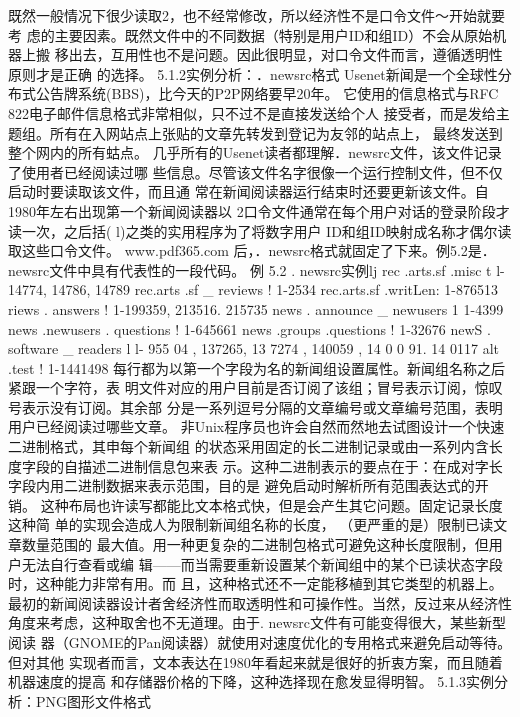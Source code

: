 \documentclass[11pt,oneside]{book}
\begin{document}
\begin{common-format}
    既然一般情况下很少读取2，也不经常修改，所以经济性不是口令文件～开始就要考
虑的主要因素。既然文件中的不同数据（特别是用户ID和组ID）不会从原始机器上搬
移出去，互用性也不是问题。因此很明显，对口令文件而言，遵循透明性原则才是正确
的选择。
5.1.2实例分析：．newsrc格式
    Usenet新闻是一个全球性分布式公告牌系统(BBS)，比今天的P2P网络要早20年。
它使用的信息格式与RFC 822电子邮件信息格式非常相似，只不过不是直接发送给个人
接受者，而是发给主题组。所有在入网站点上张贴的文章先转发到登记为友邻的站点上，
最终发送到整个网内的所有蛄点。
    几乎所有的Usenet读者都理解．newsrc文件，该文件记录了使用者已经阅读过哪
些信息。尽管该文件名字很像一个运行控制文件，但不仅启动时要读取该文件，而且通
常在新闻阅读器运行结束时还要更新该文件。自1980年左右出现第一个新闻阅读器以
2口令文件通常在每个用户对话的登录阶段才读一次，之后括( l)之类的实用程序为了将数字用户
ID和组ID映射成名称才偶尔读取这些口令文件。
www.pdf365.com
后，．newsrc格式就固定了下来。例5.2是．newsrc文件中具有代表性的一段代码。
例 5.2    . newsrc实例lj
rec .arts.sf .misc t  l-14774, 14786, 14789
rec.arts .sf _ reviews !   1-2534
rec.arts.sf .writLen:  1-876513
riews . answers !   1-199359, 213516. 215735
news . announce _ newusers 1   1-4399
news .newusers . questions !   1-645661
news .groups .questions !   1-32676
newS . software _ readers l   l- 955 04 , 137265, 13 7274 , 140059 , 14 0 0 91. 14 0117
alt .test !  1-1441498
    每行都为以第一个字段为名的新闻组设置属性。新闻组名称之后紧跟一个字符，表
明文件对应的用户目前是否订阅了该组；冒号表示订阅，惊叹号表示没有订阅。其余部
分是一系列逗号分隔的文章编号或文章编号范围，表明用户已经阅读过哪些文章。
    非Unix程序员也许会自然而然地去试图设计一个快速二进制格式，其申每个新闻组
的状态采用固定的长二进制记录或由一系列内含长度字段的自描述二进制信息包来表
示。这种二进制表示的要点在于：在成对字长字段内用二进制数据来表示范围，目的是
避免启动时解析所有范围表达式的开销。
    这种布局也许读写都能比文本格式快，但是会产生其它问题。固定记录长度这种简
单的实现会造成人为限制新闻组名称的长度，  （更严重的是）限制已读文章数量范围的
最大值。用一种更复杂的二进制包格式可避免这种长度限制，但用户无法自行查看或编
辑——而当需要重新设置某个新闻组中的某个已读状态字段时，这种能力非常有用。而
且，这种格式还不一定能移植到其它类型的机器上。
    最初的新闻阅读器设计者舍经济性而取透明性和可操作性。当然，反过来从经济性
角度来考虑，这种取舍也不无道理。由于. newsrc文件有可能变得很大，某些新型阅读
器（GNOME的Pan阅读器）就使用对速度优化的专用格式来避免启动等待。但对其他
实现者而言，文本表达在1980年看起来就是很好的折衷方案，而且随着机器速度的提高
和存储器价格的下降，这种选择现在愈发显得明智。
5.1.3实例分析：PNG图形文件格式

\end{common-format}
\end{document}

